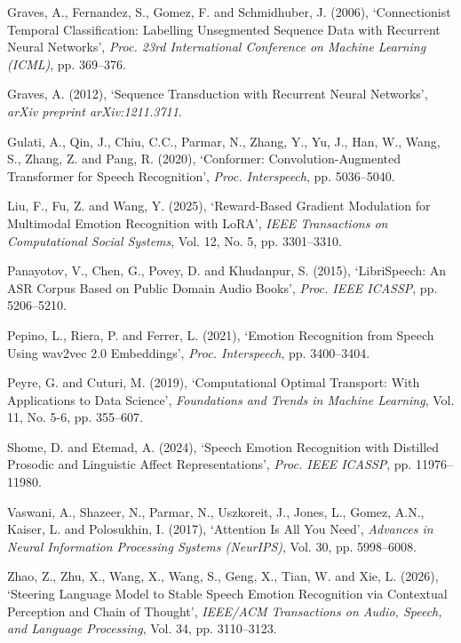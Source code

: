 \documentclass[12pt,a4paper]{report}
\begin{document}
\begin{singlespace}
\vspace{0.4cm}
\noindent Graves, A., Fernandez, S., Gomez, F. and Schmidhuber, J. (2006), `Connectionist Temporal Classification: Labelling Unsegmented Sequence Data with Recurrent Neural Networks', \textit{Proc. 23rd International Conference on Machine Learning (ICML)}, pp. 369--376.

\vspace{0.4cm}
\noindent Graves, A. (2012), `Sequence Transduction with Recurrent Neural Networks', \textit{arXiv preprint arXiv:1211.3711}.

\vspace{0.4cm}
\noindent Gulati, A., Qin, J., Chiu, C.C., Parmar, N., Zhang, Y., Yu, J., Han, W., Wang, S., Zhang, Z. and Pang, R. (2020), `Conformer: Convolution-Augmented Transformer for Speech Recognition', \textit{Proc. Interspeech}, pp. 5036--5040.

\vspace{0.4cm}
\noindent Liu, F., Fu, Z. and Wang, Y. (2025), `Reward-Based Gradient Modulation for Multimodal Emotion Recognition with LoRA', \textit{IEEE Transactions on Computational Social Systems}, Vol. 12, No. 5, pp. 3301--3310.

\vspace{0.4cm}
\noindent Panayotov, V., Chen, G., Povey, D. and Khudanpur, S. (2015), `LibriSpeech: An ASR Corpus Based on Public Domain Audio Books', \textit{Proc. IEEE ICASSP}, pp. 5206--5210.

\vspace{0.4cm}
\noindent Pepino, L., Riera, P. and Ferrer, L. (2021), `Emotion Recognition from Speech Using wav2vec 2.0 Embeddings', \textit{Proc. Interspeech}, pp. 3400--3404.

\vspace{0.4cm}
\noindent Peyre, G. and Cuturi, M. (2019), `Computational Optimal Transport: With Applications to Data Science', \textit{Foundations and Trends in Machine Learning}, Vol. 11, No. 5-6, pp. 355--607.

\vspace{0.4cm}
\noindent Shome, D. and Etemad, A. (2024), `Speech Emotion Recognition with Distilled Prosodic and Linguistic Affect Representations', \textit{Proc. IEEE ICASSP}, pp. 11976--11980.

\vspace{0.4cm}
\noindent Vaswani, A., Shazeer, N., Parmar, N., Uszkoreit, J., Jones, L., Gomez, A.N., Kaiser, L. and Polosukhin, I. (2017), `Attention Is All You Need', \textit{Advances in Neural Information Processing Systems (NeurIPS)}, Vol. 30, pp. 5998--6008.

\vspace{0.4cm}
\noindent Zhao, Z., Zhu, X., Wang, X., Wang, S., Geng, X., Tian, W. and Xie, L. (2026), `Steering Language Model to Stable Speech Emotion Recognition via Contextual Perception and Chain of Thought', \textit{IEEE/ACM Transactions on Audio, Speech, and Language Processing}, Vol. 34, pp. 3110--3123.
\end{singlespace}
\end{document}
